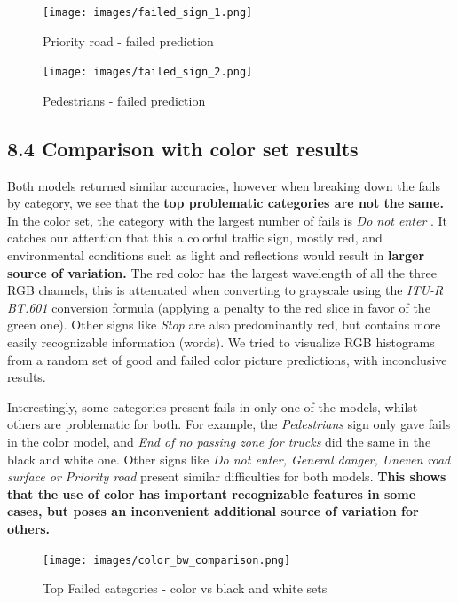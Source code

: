\documentclass[
  11pt,
]{article}
\begin{document}
\begin{figure}
\centering
\texttt{[image: images/failed\_sign\_1.png]}
\caption{Priority road - failed prediction}
\end{figure}

\begin{figure}
\centering
\texttt{[image: images/failed\_sign\_2.png]}
\caption{Pedestrians - failed prediction}
\end{figure}

\hypertarget{comparison-with-color-set-results}{%
\subsection{8.4 Comparison with color set
results}\label{comparison-with-color-set-results}}

Both models returned similar accuracies, however when breaking down the
fails by category, we see that the \textbf{top problematic categories
are not the same.} In the color set, the category with the largest
number of fails is \emph{Do not enter} . It catches our attention that
this a colorful traffic sign, mostly red, and environmental conditions
such as light and reflections would result in \textbf{larger source of
variation.} The red color has the largest wavelength of all the three
RGB channels, this is attenuated when converting to grayscale using the
\emph{ITU-R BT.601} conversion formula (applying a penalty to the red
slice in favor of the green one). Other signs like \emph{Stop} are also
predominantly red, but contains more easily recognizable information
(words). We tried to visualize RGB histograms from a random set of good
and failed color picture predictions, with inconclusive results.

Interestingly, some categories present fails in only one of the models,
whilst others are problematic for both. For example, the
\emph{Pedestrians} sign only gave fails in the color model, and
\emph{End of no passing zone for trucks} did the same in the black and
white one. Other signs like \emph{Do not enter, General danger, Uneven
road surface or Priority road} present similar difficulties for both
models. \textbf{This shows that the use of color has important
recognizable features in some cases, but poses an inconvenient
additional source of variation for others.}

\begin{figure}
\centering
\texttt{[image: images/color\_bw\_comparison.png]}
\caption{Top Failed categories - color vs black and white sets}
\end{figure}
\end{document}
